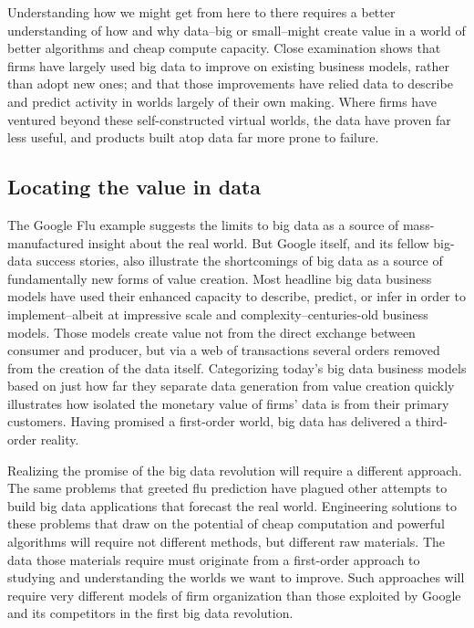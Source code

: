 \documentclass[12pt]{article}
\begin{document}
Understanding how we might get from here to there requires a better
understanding of how and why data--big or small--might create value in
a world of better algorithms and cheap compute capacity. Close
examination shows that firms have largely used big data to improve on
existing business models, rather than adopt new ones; and that those
improvements have relied data to describe and predict activity in
worlds largely of their own making. Where firms have ventured beyond
these self-constructed virtual worlds, the data have proven far less
useful, and products built atop data far more prone to failure. 


\subsection{Locating the value in data}
\label{sec:locating-value-data}


The Google Flu example suggests the limits to big data as a source of
mass-manufactured insight about the real world. But Google itself, and
its fellow big-data success stories, also illustrate the shortcomings
of big data as a source of fundamentally new forms of value creation. Most
headline big data business models have used their enhanced capacity to
describe, predict, or infer in order to implement--albeit at
impressive scale and complexity--centuries-old business models. Those
models create value not from the direct exchange between consumer and
producer, but via a web of transactions several orders removed from
the creation of the data itself. Categorizing today's big data
business models based on just how far they separate data generation
from value creation quickly illustrates how isolated the monetary
value of firms' data is from their primary customers. Having promised
a first-order world, big data has delivered a third-order
reality. 

Realizing the promise of the big data revolution will require
a different approach. The same problems that greeted flu prediction
have plagued other attempts to build big data applications that
forecast the real world. Engineering solutions to these problems that
draw on the potential of cheap computation and powerful algorithms
will require not different methods, but different raw materials. The
data those materials require must originate from a first-order
approach to studying and understanding the worlds we want to
improve. Such approaches will require very different models of firm
organization than those exploited by Google and its competitors in the
first big data revolution.
\end{document}
